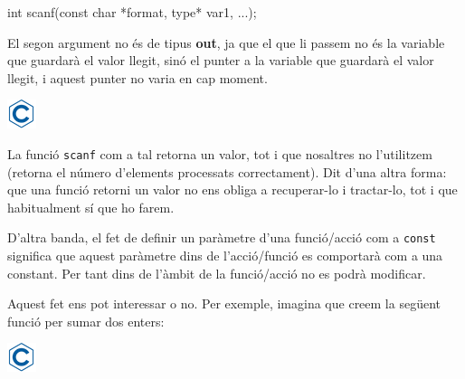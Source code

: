 \documentclass[]{book}
\newenvironment{Shaded}{\begin{snugshade}}{\end{snugshade}}
\newcommand{\DataTypeTok}[1]{\textcolor[rgb]{0.13,0.29,0.53}{#1}}
\newcommand{\StringTok}[1]{\textcolor[rgb]{0.31,0.60,0.02}{#1}}
\newcommand{\CommentTok}[1]{\textcolor[rgb]{0.56,0.35,0.01}{\textit{#1}}}
\newcommand{\NormalTok}[1]{#1}
\begin{document}
\begin{Shaded}
\begin{Highlighting}[]
\DataTypeTok{int}\NormalTok{ scanf(}\DataTypeTok{const} \DataTypeTok{char}\NormalTok{ *format, type* var1, ...);}
\end{Highlighting}
\end{Shaded}

El segon argument no és de tipus \textbf{out}, ja que el que li passem
no és la variable que guardarà el valor llegit, sinó el punter a la
variable que guardarà el valor llegit, i aquest punter no varia en cap
moment.

\includegraphics{./img/c.png}

\begin{Shaded}
\end{Shaded}

La funció \texttt{scanf} com a tal retorna un valor, tot i que nosaltres
no l'utilitzem (retorna el número d'elements processats correctament).
Dit d'una altra forma: que una funció retorni un valor no ens obliga a
recuperar-lo i tractar-lo, tot i que habitualment sí que ho farem.

D'altra banda, el fet de definir un paràmetre d'una funció/acció com a
\texttt{const} significa que aquest paràmetre dins de l'acció/funció es
comportarà com a una constant. Per tant dins de l'àmbit de la
funció/acció no es podrà modificar.

Aquest fet ens pot interessar o no. Per exemple, imagina que creem la
següent funció per sumar dos enters:

\includegraphics{./img/c.png}
\end{document}
